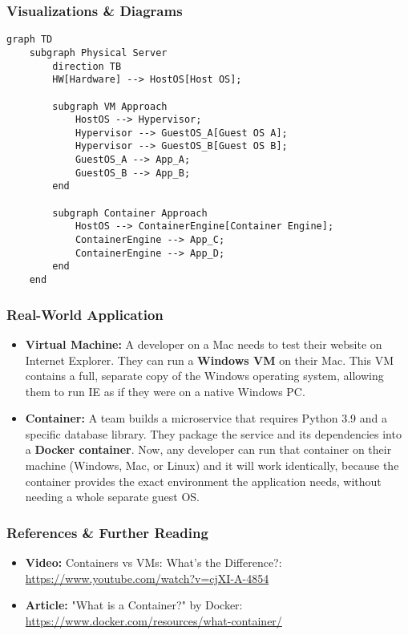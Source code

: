 \documentclass{article}
\begin{document}
\subsubsection{Visualizations \& Diagrams}
\begin{verbatim}
graph TD
    subgraph Physical Server
        direction TB
        HW[Hardware] --> HostOS[Host OS];

        subgraph VM Approach
            HostOS --> Hypervisor;
            Hypervisor --> GuestOS_A[Guest OS A];
            Hypervisor --> GuestOS_B[Guest OS B];
            GuestOS_A --> App_A;
            GuestOS_B --> App_B;
        end

        subgraph Container Approach
            HostOS --> ContainerEngine[Container Engine];
            ContainerEngine --> App_C;
            ContainerEngine --> App_D;
        end
    end
\end{verbatim}

\subsubsection{Real-World Application}
\begin{itemize}
    \item \textbf{Virtual Machine:} A developer on a Mac needs to test their website on Internet Explorer. They can run a \textbf{Windows VM} on their Mac. This VM contains a full, separate copy of the Windows operating system, allowing them to run IE as if they were on a native Windows PC.
    \item \textbf{Container:} A team builds a microservice that requires Python 3.9 and a specific database library. They package the service and its dependencies into a \textbf{Docker container}. Now, any developer can run that container on their machine (Windows, Mac, or Linux) and it will work identically, because the container provides the exact environment the application needs, without needing a whole separate guest OS.
\end{itemize}

\subsubsection{References \& Further Reading}
\begin{itemize}
    \item \textbf{Video:} Containers vs VMs: What's the Difference?: \url{https://www.youtube.com/watch?v=cjXI-A-4854}
    \item \textbf{Article:} "What is a Container?" by Docker: \url{https://www.docker.com/resources/what-container/}
\end{itemize}
\end{document}
